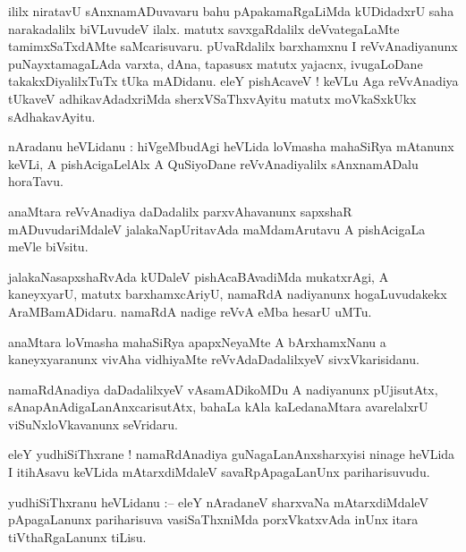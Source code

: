\documentclass{article}
\begin{document}
\begin{mn}
ililx niratavU sAnxnamADuvavaru bahu pApakamaRgaLiMda  kUDidadxrU saha narakadalilx biVLuvudeV 
ilalx. matutx savxgaRdalilx deVvategaLaMte tamimxSaTxdAMte saMcarisuvaru. pUvaRdalilx 
barxhamxnu I reVvAnadiyanunx  puNayxtamagaLAda varxta, dAna, tapasusx matutx yajacnx, 
ivugaLoDane takakxDiyalilxTuTx tUka mADidanu. eleY pishAcaveV ! keVLu Aga reVvAnadiya tUkaveV 
adhikavAdadxriMda sherxVSaThxvAyitu matutx moVkaSxkUkx sAdhakavAyitu.
\end{mn}

\begin{mn}
nAradanu heVLidanu : hiVgeMbudAgi heVLida loVmasha mahaSiRya mAtanunx  keVLi, A pishAcigaLelAlx A 
QuSiyoDane reVvAnadiyalilx sAnxnamADalu horaTavu.
\end{mn}

\begin{mn}
anaMtara reVvAnadiya daDadalilx  parxvAhavanunx sapxshaR mADuvudariMdaleV jalakaNapUritavAda 
maMdamArutavu A pishAcigaLa meVle biVsitu.
\end{mn}

\begin{mn}
jalakaNasapxshaRvAda kUDaleV pishAcaBAvadiMda mukatxrAgi, A kaneyxyarU, matutx barxhamxcAriyU, 
namaRdA nadiyanunx  hogaLuvudakekx AraMBamADidaru. namaRdA nadige reVvA eMba hesarU uMTu.
\end{mn}

\begin{mn}
anaMtara loVmasha mahaSiRya apapxNeyaMte A bArxhamxNanu a kaneyxyaranunx vivAha vidhiyaMte 
reVvAdaDadalilxyeV sivxVkarisidanu.
\end{mn}

\begin{mn}
namaRdAnadiya daDadalilxyeV vAsamADikoMDu A nadiyanunx  pUjisutAtx, sAnapAnAdigaLanAnxcarisutAtx,
bahaLa kAla kaLedanaMtara avarelalxrU viSuNxloVkavanunx seVridaru.
\end{mn}

\begin{mn}
eleY yudhiSiThxrane ! namaRdAnadiya guNagaLanAnxsharxyisi ninage heVLida I itihAsavu keVLida
mAtarxdiMdaleV savaRpApagaLanUnx  pariharisuvudu.
\end{mn}



\begin{mn}
yudhiSiThxranu heVLidanu :-- eleY nAradaneV sharxvaNa mAtarxdiMdaleV pApagaLanunx pariharisuva 
vasiSaThxniMda porxVkatxvAda inUnx itara tiVthaRgaLanunx tiLisu.
\end{mn}
\end{document}
